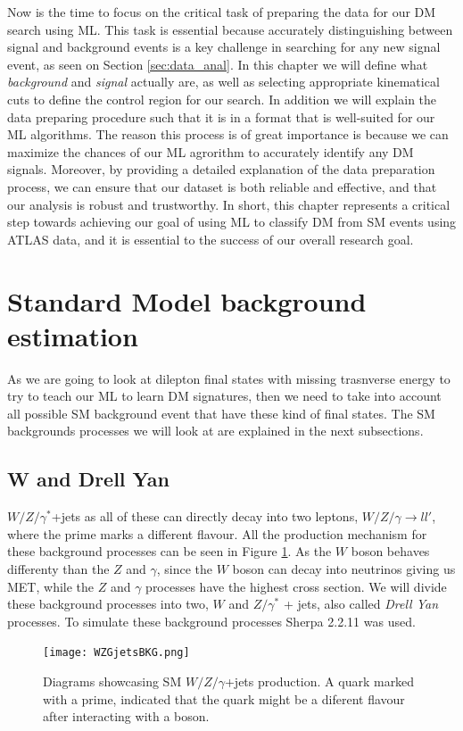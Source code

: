 \documentclass[14pt, a4paper]{book}
\begin{document}
Now is the time to focus on the critical task of preparing the data for our DM search using ML. This task is essential because accurately distinguishing between signal and background events is a key challenge in searching for any new signal event, 
as seen on Section \ref{sec:data_anal}. In this chapter we will define what \textit{background} and \textit{signal} actually are, as well as selecting appropriate kinematical cuts to define the control region for our search. In addition we will 
explain the data preparing procedure such that it is in a format that is well-suited for our ML algorithms. The reason this process is of great importance is because we can maximize the chances of our ML agrorithm to accurately identify any DM signals. 
Moreover, by providing a detailed explanation of the data preparation process, we can ensure that our dataset is both reliable and effective, and that our analysis is robust and trustworthy. In short, this chapter represents a critical step towards 
achieving our goal of using ML to classify DM from SM events using ATLAS data, and it is essential to the success of our overall research goal.



\clearpage
\section{Standard Model background estimation}
As we are going to look at dilepton final states with missing trasnverse energy to try to teach our ML to learn DM signatures, then we need to take into account all possible SM background event that have these kind of final states. The SM backgrounds processes we will look at are explained in the next subsections.

\subsection{W and Drell Yan}
$W/Z/\gamma^*$+jets as all of these can directly decay into two leptons, $W/Z/\gamma\rightarrow ll'$, where the prime marks a different flavour. All the production mechanism for these background processes can 
be seen in Figure \ref{fig:WZG_BKG}. As the $W$ boson behaves differenty than the $Z$ and $\gamma$, since the $W$ boson can decay into neutrinos giving us MET, while the $Z$ and $\gamma$ processes have the highest cross section. We will divide 
these background processes into two, $W$ and $Z/\gamma^*$ + jets, also called \textit{Drell Yan} processes. To simulate these background processes Sherpa 2.2.11 \cite{Sherpa} was used.
\graphicspath{{../../figures/}}
\begin{figure}[!ht]
    \centering
    \texttt{[image: WZGjetsBKG.png]}
    \caption[$W/Z/\gamma$+jets production]{Diagrams showcasing SM $W/Z/\gamma$+jets production. A quark marked with a prime, indicated that the quark might be a diferent flavour after interacting with a boson.}\label{fig:WZG_BKG}
\end{figure}
\end{document}
